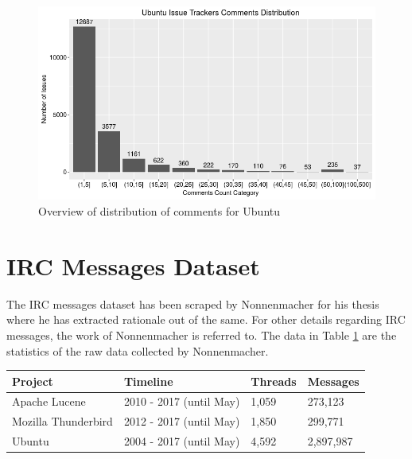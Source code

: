 \documentclass[a4paper,12pt,twoside]{report}
\begin{document}
\begin{figure}[h] %
    \centering
    \includegraphics[width=12cm]{ubuntu-comment-distribution-raw}
    \caption{Overview of distribution of comments for Ubuntu}
    \label{fig:ubuntuRawDistro}
\end{figure}


\section{IRC Messages Dataset}

The \acs{IRC} messages dataset has been scraped by Nonnenmacher \cite{Nonnenmacher2017} for his thesis where he has extracted rationale out of the same. For other details regarding \acs{IRC} messages, the work of Nonnenmacher \cite{Nonnenmacher2017} is referred to. The data in Table \ref{tab:rawIRCMessages} are the statistics of the raw data collected by Nonnenmacher. 
\noindent \newline
\begin{table} %
    \centering
    \begin{adjustbox}{max width=\columnwidth}
    \def\arraystretch{1} %
    \begin{tabular}{p{4cm} p{5cm} p{2cm} p{3cm}}
        \toprule
        \textbf{Project} & \textbf{Timeline} & \textbf{Threads} & \textbf{Messages}\\
        \midrule
			Apache Lucene & 2010 - 2017 (until May) & 1,059 & 273,123\\
			Mozilla Thunderbird & 2012 - 2017 (until May) & 1,850 & 299,771\\ 
			Ubuntu & 2004 - 2017 (until May) & 4,592 & 2,897,987\\
        \midrule
    \end{tabular}
    \end{adjustbox}
    \label{tab:rawIRCMessages}
\end{table}
\end{document}
